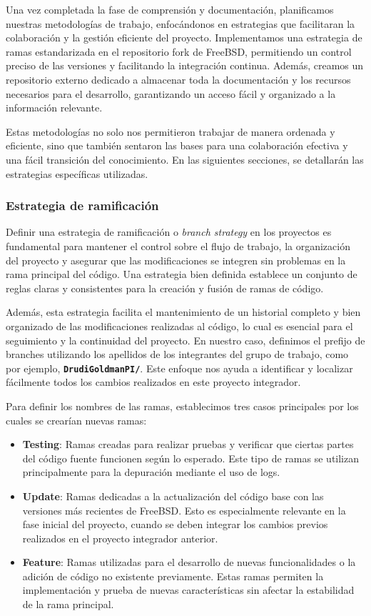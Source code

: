 Una vez completada la fase de comprensión y documentación, planificamos nuestras metodologías de trabajo, enfocándonos en estrategias que facilitaran la colaboración y la gestión eficiente del proyecto. Implementamos una estrategia de ramas estandarizada en el repositorio fork de FreeBSD, permitiendo un control preciso de las versiones y facilitando la integración continua. Además, creamos un repositorio externo dedicado a almacenar toda la documentación y los recursos necesarios para el desarrollo, garantizando un acceso fácil y organizado a la información relevante.

Estas metodologías no solo nos permitieron trabajar de manera ordenada y eficiente, sino que también sentaron las bases para una colaboración efectiva y una fácil transición del conocimiento. En las siguientes secciones, se detallarán las estrategias específicas utilizadas.

\subsubsection{Estrategia de ramificación}
Definir una estrategia de ramificación o \textit{branch strategy} en los proyectos es fundamental para mantener el control sobre el flujo de trabajo, la organización del proyecto y asegurar que las modificaciones se integren sin problemas en la rama principal del código. Una estrategia bien definida establece un conjunto de reglas claras y consistentes para la creación y fusión de ramas de código.

Además, esta estrategia facilita el mantenimiento de un historial completo y bien organizado de las modificaciones realizadas al código, lo cual es esencial para el seguimiento y la continuidad del proyecto. En nuestro caso, definimos el prefijo de branches utilizando los apellidos de los integrantes del grupo de trabajo, como por ejemplo, \texttt{\textbf{DrudiGoldmanPI/}}. Este enfoque nos ayuda a identificar y localizar fácilmente todos los cambios realizados en este proyecto integrador.

Para definir los nombres de las ramas, establecimos tres casos principales por los cuales se crearían nuevas ramas:

\begin{itemize}
    \item \textbf{Testing}: Ramas creadas para realizar pruebas y verificar que ciertas partes del código fuente funcionen según lo esperado. Este tipo de ramas se utilizan principalmente para la depuración mediante el uso de logs.
    \item \textbf{Update}: Ramas dedicadas a la actualización del código base con las versiones más recientes de FreeBSD. Esto es especialmente relevante en la fase inicial del proyecto, cuando se deben integrar los cambios previos realizados en el proyecto integrador anterior.
    \item \textbf{Feature}: Ramas utilizadas para el desarrollo de nuevas funcionalidades o la adición de código no existente previamente. Estas ramas permiten la implementación y prueba de nuevas características sin afectar la estabilidad de la rama principal.
\end{itemize}

